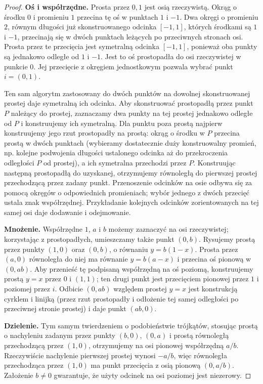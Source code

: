 \begin{proof}
\textbf{Oś i współrzędne.}
Prosta przez $0,1$ jest osią rzeczywistą. Okrąg
o środku $0$ i promieniu $1$ przecina tę oś
w punktach $1$ i $-1$. Dwa okręgi o promieniu $2$,
równym długości już skonstruowanego odcinka $[-1,1]$,
których środkami są
$1$ i $-1$, przecinają się w dwóch punktach
leżących po przeciwnych stronach osi. Prosta przez
te przecięcia jest symetralną odcinka $[-1,1]$,
ponieważ oba punkty są jednakowo odległe od $1$
i $-1$. Jest to oś prostopadła do osi rzeczywistej
w punkcie $0$. Jej przecięcie z okręgiem jednostkowym
pozwala wybrać punkt $i=(0,1)$.

Ten sam algorytm zastosowany do dwóch punktów
na dowolnej skonstruowanej prostej daje symetralną
ich odcinka. Aby skonstruować prostopadłą przez
punkt $P$ należący do prostej, zaznaczamy dwa
punkty na tej prostej jednakowo odległe od $P$
i konstruujemy ich symetralną. Dla punktu poza
prostą najpierw konstruujemy jego rzut prostopadły
na prostą: okrąg o środku w $P$ przecina prostą
w dwóch punktach (wybieramy dostatecznie duży
konstruowalny promień, np. kolejne podwojenia długości
ustalonego odcinka aż do przekroczenia odległości
$P$ od prostej), a ich symetralna
przechodzi przez $P$. Konstruując następną
prostopadłą do uzyskanej, otrzymujemy równoległą
do pierwszej prostej przechodzącą przez zadany punkt.
Przenoszenie odcinków na osie odbywa się za pomocą
okręgów o odpowiednich promieniach; wybór jednego
z dwóch przecięć ustala znak współrzędnej.
Przykładanie kolejnych odcinków zorientowanych
na tej samej osi daje dodawanie i odejmowanie.

\textbf{Mnożenie.}
Współrzędne $1$, $a$ i $b$ możemy zaznaczyć
na osi rzeczywistej; korzystając z prostopadłych,
umieszczamy także punkt $(0,b)$. Rysujemy prostą
przez punkty $(1,0)$ oraz $(0,b)$, o równaniu
$y=b(1-x)$. Prosta przez $(a,0)$ równoległa
do niej ma równanie $y=b(a-x)$ i przecina
oś pionową w $(0,ab)$. Aby przenieść tę podpisaną
współrzędną na oś poziomą,
konstruujemy prostą $y=x$ przez $0$ i $(1,1)$; ten drugi
punkt jest przecięciem pionowej przez $1$ i poziomej przez $i$.
Odbicie $(0,ab)$ względem prostej $y=x$ jest konstrukcją
cyrklem i linijką (przez rzut prostopadły i odłożenie
tej samej odległości po przeciwnej stronie prostej)
i daje punkt $(ab,0)$.

\textbf{Dzielenie.}
Tym samym twierdzeniem o podobieństwie trójkątów,
stosując prostą o nachyleniu zadanym przez
punkty $(b,0)$, $(0,a)$ i prostą równoległą
przechodzącą przez $(1,0)$, otrzymujemy
na osi pionowej współrzędną $a/b$.
Rzeczywiście nachylenie pierwszej prostej wynosi
$-a/b$, więc równoległa przechodząca przez $(1,0)$
ma punkt przecięcia z osią pionową $(0,a/b)$.
Założenie $b\ne0$ gwarantuje, że użyty odcinek
na osi poziomej jest niezerowy.


\end{proof}
